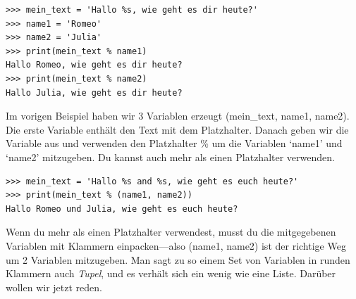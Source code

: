 \begin{Verbatim}[frame=single]
>>> mein_text = 'Hallo %s, wie geht es dir heute?'
>>> name1 = 'Romeo'
>>> name2 = 'Julia'
>>> print(mein_text % name1)
Hallo Romeo, wie geht es dir heute?
>>> print(mein_text % name2)
Hallo Julia, wie geht es dir heute?
\end{Verbatim}

Im vorigen Beispiel haben wir 3 Variablen erzeugt (mein\_text, name1, name2). Die erste Variable enthält den Text mit dem Platzhalter. Danach geben wir die Variable aus und verwenden den Platzhalter \% um die Variablen `name1' und `name2' mitzugeben. Du kannst auch mehr als einen Platzhalter verwenden.

\begin{Verbatim}[frame=single]
>>> mein_text = 'Hallo %s and %s, wie geht es euch heute?'
>>> print(mein_text % (name1, name2))
Hallo Romeo und Julia, wie geht es euch heute?
\end{Verbatim}

Wenn du mehr als einen Platzhalter verwendest, musst du die mitgegebenen Variablen mit Klammern einpacken---also (name1, name2) ist der richtige Weg um 2 Variablen mitzugeben. Man sagt zu so einem Set von Variablen in runden Klammern auch \emph{Tupel}, und es verhält sich ein wenig wie eine Liste. Darüber wollen wir jetzt reden.

